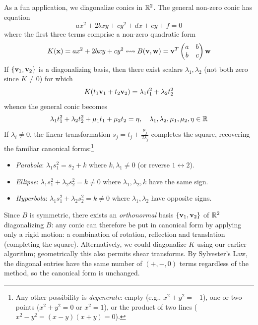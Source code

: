 As a fun application, we diagonalize conics in $\mathbb{R}^2$. The general non-zero conic has equation
\[
	ax^2+2bxy+cy^2+dx+ey+f=0
\]
where the first three terms comprise a non-zero quadratic form
\[
	K({\mathbf{x}})=ax^2+2bxy+cy^2
	\leftrightsquigarrow B({\mathbf{v}},{\mathbf{w}})={\mathbf{v}}^T
	\begin{pmatrix}
		a&b\\
		b&c
	\end{pmatrix}
	{\mathbf{w}}
\]
If $\{{\mathbf{v}}_1,{\mathbf{v}}_2\}$ is a diagonalizing basis, then there exist scalars $\lambda_1,\lambda_2$ (not both zero since $K\neq 0$) for which
\[
	K(t_1{\mathbf{v}}_1+t_2{\mathbf{v}}_2)=\lambda_1t_1^2+\lambda_2t_2^2
\]
whence the general conic becomes
\[
	\lambda_1t_1^2+\lambda_2t_2^2+\mu_1t_1+\mu_2t_2=\eta,\quad 
	\lambda_1,\lambda_2,\mu_1,\mu_2,\eta\in\mathbb{R}
\]
If $\lambda_i\neq 0$, the linear transformation $s_j=t_j+\frac{\mu_j}{2\lambda_j}$ completes the square, recovering the familiar canonical forms:\footnote{Any other possibility is \emph{degenerate}: empty (e.g., $x^2+y^2=-1$), one or two points ($x^2+y^2=0$ or $x^2=1$), or the product of two lines ($x^2-y^2=(x-y)(x+y)=0$).}
\begin{itemize}
	\item[]\normalfont\emph{Parabola}: $\lambda_1s_1^2=s_2+k$  where $k,\lambda_1\neq 0$ (or reverse $1\leftrightarrow 2$).
	\item[]\normalfont\emph{Ellipse}: $\lambda_1s_1^2+\lambda_2s_2^2=k\neq 0$ where $\lambda_1,\lambda_2,k$ have the same sign.
	\item[]\normalfont\emph{Hyperbola}: $\lambda_1s_1^2+\lambda_2s_2^2=k\neq 0$ where $\lambda_1,\lambda_2$ have opposite signs.
\end{itemize}
Since $B$ is symmetric, there exists an \emph{orthonormal} basis $\{{\mathbf{v}}_1,{\mathbf{v}}_2\}$ of $\mathbb{R}^2$ diagonalizing $B$: any conic can therefore be put in canonical form by applying only a rigid motion: a combination of rotation, reflection and translation (completing the square).\smallbreak
Alternatively, we could diagonalize $K$ using our earlier algorithm; geometrically this also permits shear transforms. By Sylvester's Law, the diagonal entries have the same number of $(+,-,0)$ terms regardless of the method, so the canonical form is unchanged.


